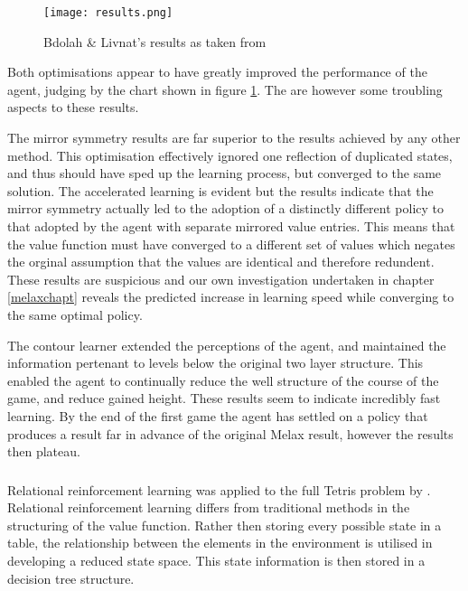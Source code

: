\documentclass{rucsthesis}
\begin{document}
\begin{figure}[h]
\centering
\texttt{[image: results.png]}
\caption{Bdolah \& Livnat's results as taken from \cite{yaeltetris}}
\label{fig:yaelres}
\end{figure}

Both optimisations appear to have greatly improved the performance of the agent, judging by the chart shown in figure \ref{fig:yaelres}. The are however some troubling aspects to these results.

The mirror symmetry results are far superior to the results achieved by any other method. This optimisation effectively ignored one reflection of duplicated states, and thus should have sped up the learning process, but converged to the same solution. The accelerated learning is evident but the results indicate that the mirror symmetry actually led to the adoption of a distinctly different policy to that adopted by the agent with separate mirrored value entries. This means that the value function must have converged to a different set of values which negates the orginal assumption that the values are identical and therefore redundent. These results are suspicious and our own investigation undertaken in chapter \ref{melaxchapt} reveals the predicted increase in learning speed while converging to the same optimal policy.

The contour learner extended the perceptions of the agent, and maintained the information pertenant to levels below the original two layer structure. This enabled the agent to continually reduce the well structure of the course of the game, and reduce gained height. These results seem to indicate incredibly fast learning. By the end of the first game the agent has settled on a policy that produces a result far in advance of the original Melax result, however the results then plateau. 

\subsubsection{\cite{kurt}}

Relational reinforcement learning was applied to the full Tetris problem by \cite{kurt}. Relational reinforcement learning differs from traditional methods in the structuring of the value function. Rather then storing every possible state in a table, the relationship between the elements in the environment is utilised in developing a reduced state space. This state information is then stored in a decision tree structure. 
\end{document}

